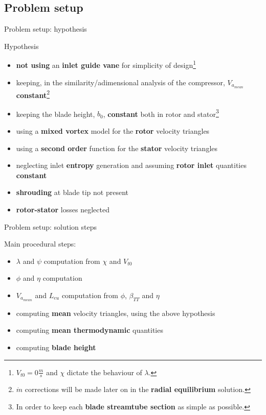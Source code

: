 \subsection{Problem setup}
	{\nologo
	\begin{frame}{Problem setup: hypothesis}
		\begin{alertblock}{Hypothesis}
			\begin{itemize}
				\item \textbf{not using} an \textbf{inlet guide vane} for simplicity of design\footnote{$V_{t0} = 0 \frac{m}{s}$ and $\chi$ dictate the behaviour of $\lambda$.}
				\item keeping, in the similarity/adimensional analysis of the compressor, $V_{a_{mean}}$ \textbf{constant}\footnote{$\dot{m}$ corrections will be made later on in the \textbf{radial equilibrium} solution.}  
				\item keeping the blade height, $b_0$, \textbf{constant} both in rotor and stator\footnote{In order to keep each \textbf{blade streamtube section} as simple as possible.}
				\item using a \textbf{mixed vortex} model for the \textbf{rotor} velocity triangles
				\item using a \textbf{second order} function for the \textbf{stator} velocity triangles 
				\item neglecting inlet \textbf{entropy} generation and assuming \textbf{rotor inlet} quantities \textbf{constant}
				\item \textbf{shrouding} at blade tip not present
				\item \textbf{rotor-stator} losses neglected
			\end{itemize}
		\end{alertblock}
	\end{frame}
	}
	
	\begin{frame}{Problem setup: solution steps}
		\begin{block}{Main procedural steps:}
			\begin{itemize}
				\item $\lambda$ and $\psi$ computation from $\chi$ and $V_{t0}$
				\item $\phi$ and $\eta$ computation 
				\item $V_{a_{mean}}$ and $L_{eu}$ computation from $\phi$, $\beta_{TT}$ and $\eta$
				\item computing \textbf{mean} velocity triangles, using the above hypothesis
				\item computing \textbf{mean thermodynamic} quantities 
				\item computing \textbf{blade height}
			\end{itemize}
		\end{block}
	\end{frame}

